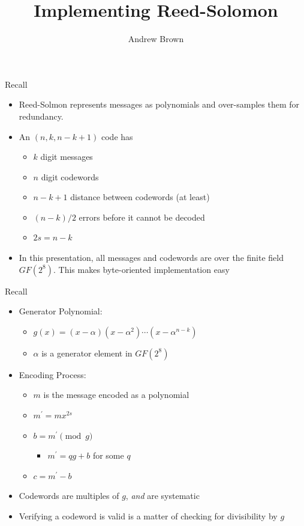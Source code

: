 \documentclass[]{prosper}
\title{Implementing Reed-Solomon}
\author{Andrew Brown}
\begin{document}
\maketitle

\begin{slide}{Recall}
\begin{itemize}
\item Reed-Solmon represents messages as polynomials and over-samples them for redundancy.
\item An $(n, k, n-k+1)$ code has
    \begin{itemize}
    \item $k$ digit messages
    \item $n$ digit codewords
    \item $n-k+1$ distance between codewords (at least)
    \item $(n-k)/2$ errors before it cannot be decoded
    \item $2s = n-k$
    \end{itemize}

\item In this presentation, all messages and codewords are over the finite field $GF(2^8)$. This makes byte-oriented implementation easy
\end{itemize}
\end{slide}

\begin{slide}{Recall}
\begin{itemize}
    \item Generator Polynomial:
    \begin{itemize}
        \item $g(x) = (x-\alpha)(x-\alpha^2) \cdots (x-\alpha ^{n-k})$
        \item $\alpha$ is a generator element in $GF(2^8)$
    \end{itemize}

    \item Encoding Process:
    \begin{itemize}
        \item $m$ is the message encoded as a polynomial
        \item $m^\prime = m x^{2s}$
        \item $b = m^\prime \pmod{g}$
        \begin{itemize}
            \item $m^\prime = q g + b$ for some $q$
        \end{itemize}
        \item $c = m^\prime - b$
    \end{itemize}
    \item Codewords are multiples of $g$, {\it and} are systematic
    \item Verifying a codeword is valid is a matter of checking for divisibility by $g$

\end{itemize}
\end{slide}
\end{document}
